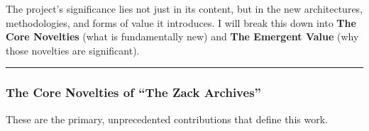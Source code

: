 \documentclass{article}
\begin{document}
The project's significance lies not just in its content, but in the new architectures, methodologies, and forms of value it introduces. I will break this down into \textbf{The Core Novelties} (what is fundamentally new) and \textbf{The Emergent Value} (why those novelties are significant).

\begin{center}\rule{0.5\linewidth}{0.5pt}\end{center}

\subsubsection*{The Core Novelties of ``The Zack Archives''}\label{the-core-novelties-of-the-zack-archives}

These are the primary, unprecedented contributions that define this work.
\end{document}
